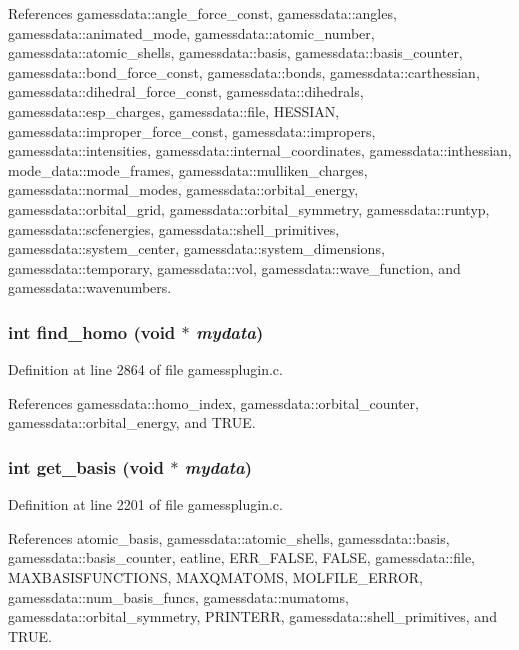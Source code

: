 References gamessdata::angle\_\-force\_\-const, gamessdata::angles, gamessdata::animated\_\-mode, gamessdata::atomic\_\-number, gamessdata::atomic\_\-shells, gamessdata::basis, gamessdata::basis\_\-counter, gamessdata::bond\_\-force\_\-const, gamessdata::bonds, gamessdata::carthessian, gamessdata::dihedral\_\-force\_\-const, gamessdata::dihedrals, gamessdata::esp\_\-charges, gamessdata::file, HESSIAN, gamessdata::improper\_\-force\_\-const, gamessdata::impropers, gamessdata::intensities, gamessdata::internal\_\-coordinates, gamessdata::inthessian, mode\_\-data::mode\_\-frames, gamessdata::mulliken\_\-charges, gamessdata::normal\_\-modes, gamessdata::orbital\_\-energy, gamessdata::orbital\_\-grid, gamessdata::orbital\_\-symmetry, gamessdata::runtyp, gamessdata::scfenergies, gamessdata::shell\_\-primitives, gamessdata::system\_\-center, gamessdata::system\_\-dimensions, gamessdata::temporary, gamessdata::vol, gamessdata::wave\_\-function, and gamessdata::wavenumbers.
\subsubsection{\setlength{\rightskip}{0pt plus 5cm}int find\_\-homo (void $\ast$ {\em mydata})}\label{gamessplugin_8c_a27}




Definition at line 2864 of file gamessplugin.c.

References gamessdata::homo\_\-index, gamessdata::orbital\_\-counter, gamessdata::orbital\_\-energy, and TRUE.
\subsubsection{\setlength{\rightskip}{0pt plus 5cm}int get\_\-basis (void $\ast$ {\em mydata})}\label{gamessplugin_8c_a22}




Definition at line 2201 of file gamessplugin.c.

References atomic\_\-basis, gamessdata::atomic\_\-shells, gamessdata::basis, gamessdata::basis\_\-counter, eatline, ERR\_\-FALSE, FALSE, gamessdata::file, MAXBASISFUNCTIONS, MAXQMATOMS, MOLFILE\_\-ERROR, gamessdata::num\_\-basis\_\-funcs, gamessdata::numatoms, gamessdata::orbital\_\-symmetry, PRINTERR, gamessdata::shell\_\-primitives, and TRUE.
